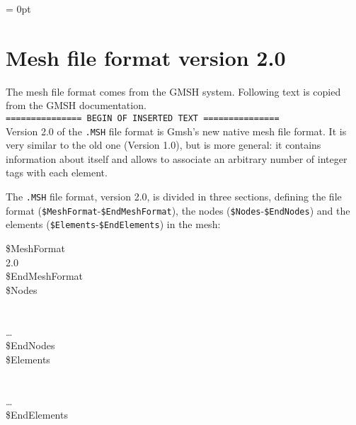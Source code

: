 

\parindent = 0pt

\section*{Mesh file format version 2.0}
The mesh file format comes from the GMSH system. 
Following text is copied from the GMSH documentation.\\[0.5em]

{\tt =============== BEGIN OF INSERTED TEXT ===============}\\[0.3em]

Version 2.0 of the {\tt .MSH} file format is Gmsh's new native mesh file
format. It is very similar to the old one (Version 1.0), but is more
general: it contains information about itself and allows to associate an
arbitrary number of integer tags with each element.

The {\tt .MSH} file format, version 2.0, is divided in three sections,
defining the file format ({\tt \$MeshFormat}-{\tt \$EndMeshFormat}), the
nodes ({\tt \$Nodes}-{\tt \$EndNodes}) and the elements
({\tt \$Elements}-{\tt \$EndElements}) in the mesh:

\begin{fileformat}
\$MeshFormat\\
2.0  \\
\$EndMeshFormat\\
\$Nodes\\
\\
   \\
\dots\\
\$EndNodes\\
\$Elements\\
\\
    \\
\dots\\
\$EndElements
\end{fileformat}

